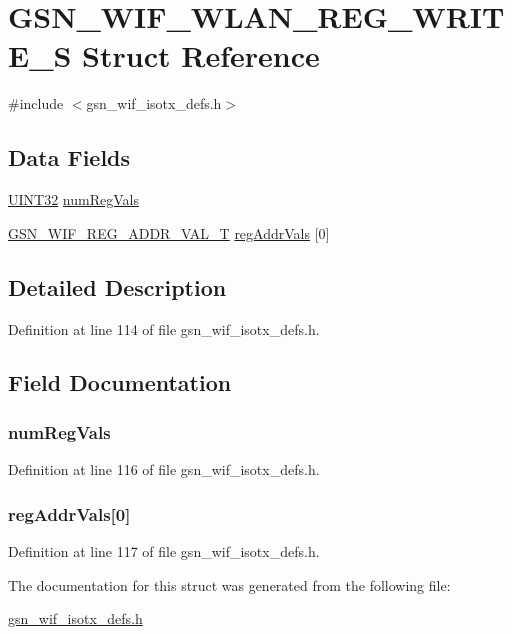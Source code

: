 \hypertarget{a00394}{
\section{GSN\_\-WIF\_\-WLAN\_\-REG\_\-WRITE\_\-S Struct Reference}
\label{a00394}
}


{\ttfamily \#include $<$gsn\_\-wif\_\-isotx\_\-defs.h$>$}

\subsection*{Data Fields}
\begin{DoxyCompactItemize}
\item 
\hyperlink{a00660_gae1e6edbbc26d6fbc71a90190d0266018}{UINT32} \hyperlink{a00394_a02a25b3146bce97d6010cc1c57d9e002}{numRegVals}
\item 
\hyperlink{a00343}{GSN\_\-WIF\_\-REG\_\-ADDR\_\-VAL\_\-T} \hyperlink{a00394_a149d2ca83a1ff827c8b5932115faa471}{regAddrVals} \mbox{[}0\mbox{]}
\end{DoxyCompactItemize}


\subsection{Detailed Description}


Definition at line 114 of file gsn\_\-wif\_\-isotx\_\-defs.h.



\subsection{Field Documentation}
\hypertarget{a00394_a02a25b3146bce97d6010cc1c57d9e002}{
\subsubsection[{numRegVals}]{ {\bf numRegVals}}}
\label{a00394_a02a25b3146bce97d6010cc1c57d9e002}


Definition at line 116 of file gsn\_\-wif\_\-isotx\_\-defs.h.

\hypertarget{a00394_a149d2ca83a1ff827c8b5932115faa471}{
\subsubsection[{regAddrVals}]{ {\bf regAddrVals}\mbox{[}0\mbox{]}}}
\label{a00394_a149d2ca83a1ff827c8b5932115faa471}


Definition at line 117 of file gsn\_\-wif\_\-isotx\_\-defs.h.



The documentation for this struct was generated from the following file:\begin{DoxyCompactItemize}
\item 
\hyperlink{a00611}{gsn\_\-wif\_\-isotx\_\-defs.h}\end{DoxyCompactItemize}
